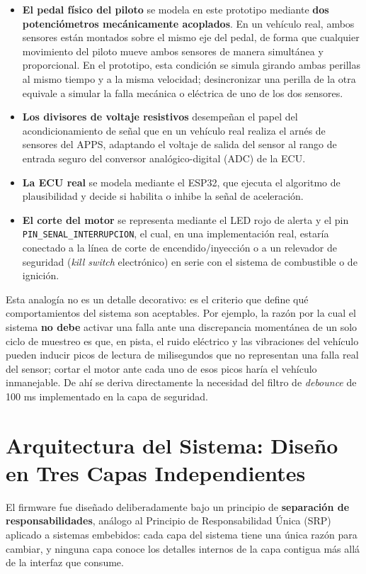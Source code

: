 \documentclass[12pt, letterpaper]{article}
\begin{document}
	\begin{itemize}
		\item \textbf{El pedal físico del piloto} se modela en este prototipo mediante \textbf{dos potenciómetros mecánicamente acoplados}. En un vehículo real, ambos sensores están montados sobre el mismo eje del pedal, de forma que cualquier movimiento del piloto mueve ambos sensores de manera simultánea y proporcional. En el prototipo, esta condición se simula girando ambas perillas al mismo tiempo y a la misma velocidad; desincronizar una perilla de la otra equivale a simular la falla mecánica o eléctrica de uno de los dos sensores.
		\item \textbf{Los divisores de voltaje resistivos} desempeñan el papel del acondicionamiento de señal que en un vehículo real realiza el arnés de sensores del APPS, adaptando el voltaje de salida del sensor al rango de entrada seguro del conversor analógico-digital (ADC) de la ECU.
		\item \textbf{La ECU real} se modela mediante el ESP32, que ejecuta el algoritmo de plausibilidad y decide si habilita o inhibe la señal de aceleración.
		\item \textbf{El corte del motor} se representa mediante el LED rojo de alerta y el pin \texttt{PIN\_SENAL\_INTERRUPCION}, el cual, en una implementación real, estaría conectado a la línea de corte de encendido/inyección o a un relevador de seguridad (\textit{kill switch} electrónico) en serie con el sistema de combustible o de ignición.
	\end{itemize}
	
	Esta analogía no es un detalle decorativo: es el criterio que define qué comportamientos del sistema son aceptables. Por ejemplo, la razón por la cual el sistema \textbf{no debe} activar una falla ante una discrepancia momentánea de un solo ciclo de muestreo es que, en pista, el ruido eléctrico y las vibraciones del vehículo pueden inducir picos de lectura de milisegundos que no representan una falla real del sensor; cortar el motor ante cada uno de esos picos haría el vehículo inmanejable. De ahí se deriva directamente la necesidad del filtro de \textit{debounce} de 100 ms implementado en la capa de seguridad.
	
	\section{Arquitectura del Sistema: Diseño en Tres Capas Independientes}
	El firmware fue diseñado deliberadamente bajo un principio de \textbf{separación de responsabilidades}, análogo al Principio de Responsabilidad Única (SRP) aplicado a sistemas embebidos: cada capa del sistema tiene una única razón para cambiar, y ninguna capa conoce los detalles internos de la capa contigua más allá de la interfaz que consume.
	
\end{document}
